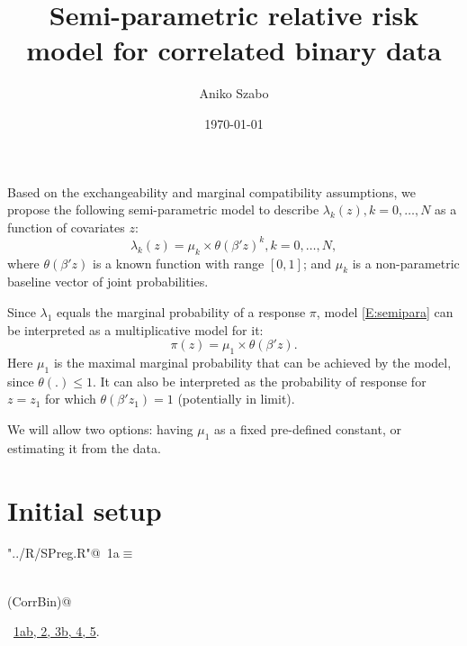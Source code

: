 \documentclass[reqno]{amsart}
\title{Semi-parametric relative risk model for correlated binary data}
\author{Aniko Szabo}
\date{\today}
\renewcommand{\NWtarget}[2]{\hypertarget{#1}{#2}}
\renewcommand{\NWlink}[2]{\hyperlink{#1}{#2}}
\begin{document}
\maketitle

Based on the exchangeability and marginal compatibility assumptions, we propose the following semi-parametric model to describe  $\lambda_k(z), k=0,\ldots, N$ as a function of covariates $z$:
\begin{equation}\label{E:semipara}
	\lambda_k(z) = {\mu_k} \times {\theta(\beta' z)^k}, k = 0, \dots, N,
\end{equation}
where $\theta(\beta' z)$ is a known function with range $[0,1]$; and $\mu_k$ is a non-parametric baseline vector of joint probabilities.

Since $\lambda_1$ equals the marginal probability of a response $\pi$, model \eqref{E:semipara} can be interpreted as a multiplicative model for it:
\begin{equation*}
  \pi(z) = \mu_1 \times \theta(\beta'z).
\end{equation*}
Here $\mu_1$ is the maximal marginal probability that can be achieved by the model, since $\theta(.) \leq 1$. It can also be interpreted as the probability of response for $z=z_1$ for which $\theta(\beta'z_1) = 1$ (potentially in limit).

We will allow two options: having $\mu_1$ as a fixed pre-defined constant, or estimating it from the data.


\section{Initial setup}
\begin{flushleft} \small\label{scrap1}\raggedright\small
\NWtarget{nuweb1a}{} \verb@"../R/SPreg.R"@\nobreak\ {\footnotesize {1a}}$\equiv$
\vspace{-1ex}
\begin{list}{}{} \item
\mbox{}\verb@@\\
\mbox{}\verb@require(CorrBin)@\\
\mbox{}\verb@@{\NWsep}
\end{list}
\vspace{-1.5ex}
\footnotesize
\begin{list}{}{\setlength{\itemsep}{-\parsep}\setlength{\itemindent}{-\leftmargin}}
\item \NWtxtFileDefBy\ \NWlink{nuweb1a}{1a}\NWlink{nuweb1b}{b}\NWlink{nuweb2}{, 2}\NWlink{nuweb3b}{, 3b}\NWlink{nuweb4}{, 4}\NWlink{nuweb5}{, 5}.

\item{}
\end{list}
\vspace{4ex}
\end{flushleft}
\end{document}
